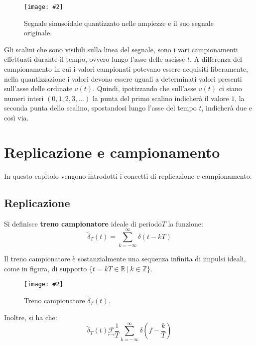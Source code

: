 \documentclass[a4paper]{article}
\newcommand{\F}{\mathcal{F}}
\newcommand{\customimg}[2]{\texttt{[image: \#2]}}
\begin{document}
	\begin{figure}[!htp]
		\centering
		\customimg{0.7}{img/quantizzazione.pdf}
		\caption{Segnale sinusoidale quantizzato nelle ampiezze e il suo segnale originale.}
		\label{img-quant_esempio}
	\end{figure}

	Gli scalini che sono visibili sulla linea del segnale, sono i vari campionamenti effettuati durante il tempo, ovvero lungo l’asse delle ascisse $t$. A differenza del campionamento in cui i valori campionati potevano essere acquisiti liberamente, nella quantizzazione i valori devono essere uguali a determinati valori presenti sull’asse delle ordinate $v(t)$. Quindi, ipotizzando che sull’asse $v(t)$ ci siano numeri interi $(0, 1, 2, 3, ...)$ la punta del primo scalino indicherà il valore $1$, la seconda punta dello scalino, spostandosi lungo l'asse del tempo $t$, indicherà due e così via.
	
	\section{Replicazione e campionamento}\label{sec-rep_e_camp}
	
	In questo capitolo vengono introdotti i concetti di replicazione e campionamento.
	
	\subsection{Replicazione}\label{subsec-rep}

	Si definisce \textbf{treno campionatore} ideale di periodo$T$ la funzione:
	\begin{equation}\label{eq-treno_camp}
		\tilde{\delta}_T(t) = \sum_{k=-\infty}^{\infty} \delta(t-kT)
	\end{equation}

	Il treno campionatore è sostanzialmente una sequenza infinita di impulsi ideali, come in figura, di supporto $\{t = kT \in \mathbb{R}\:|\:k \in \mathbb{Z}\}$.
	
	\begin{figure}[!htp]
		\centering
		\customimg{0.5}{img/treno-campionatore.pdf}
		\caption{Treno campionatore $\tilde{\delta}_T(t)$.}
		\label{img-treno_camp}
	\end{figure}

	Inoltre, si ha che:
	\begin{equation*}
		\tilde{\delta}_T(t) \underset{\longleftrightarrow}{\F} \dfrac{1}{T} \sum_{k=-\infty}^{\infty} \delta\left(f-\dfrac{k}{T}\right)
	\end{equation*}
	
\end{document}
